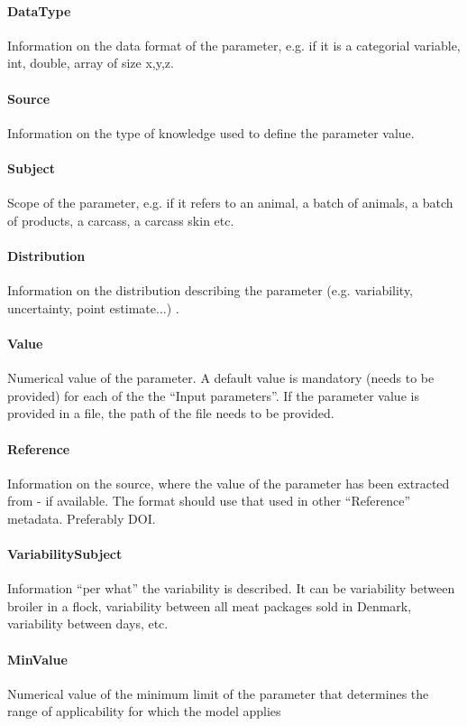 \documentclass[a4paper]{report}
\begin{document}
\paragraph{DataType}
Information on the data format of the parameter, e.g. if it is a categorial variable, int, double, array of size x,y,z.

\paragraph{Source}
Information on the type of knowledge used to define the parameter value.

\paragraph{Subject}
Scope of the parameter, e.g. if it refers to an animal, a batch of animals, a batch of products, a carcass, a carcass skin etc.

\paragraph{Distribution}
Information on the distribution describing the parameter (e.g. variability, uncertainty, point estimate...) .

\paragraph{Value}
Numerical value of the parameter. A default value is mandatory (needs to be provided) for each of the the ``Input parameters''. If the parameter value is provided in a file, the path of the file needs to be provided.

\paragraph{Reference}
Information on the source, where the value of the parameter has been extracted from - if available. The format should use that used in other ``Reference'' metadata. Preferably DOI.

\paragraph{VariabilitySubject}
Information ``per what'' the variability is described. It can be variability between broiler in a flock,  variability between all meat packages sold in Denmark, variability between days, etc.

\paragraph{MinValue}
Numerical value of the minimum limit of the parameter that determines the range of applicability for which the model applies
\end{document}
